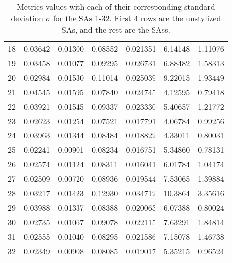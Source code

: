 \begin{table}[H]
\begin{tabular}{|l|l|l|l|l|l|l|}
	18 & 0.03642& 0.01300 & 0.08552& 0.021351 & 6.14148 & 1.11076\\
	19 & 0.03458& 0.01077 & 0.09295& 0.026731 & 6.88482 & 1.58313\\
	20 & 0.02984& 0.01530 & 0.11014& 0.025039 & 9.22015 & 1.93449\\
	21 & 0.04545& 0.01595 & 0.07840& 0.024745 & 4.12595 & 0.79418\\
	22 & 0.03921& 0.01545 & 0.09337& 0.023330 & 5.40657 & 1.21772\\
	23 & 0.02623& 0.01254 & 0.07521& 0.017791 & 4.06784 & 0.99256\\
	24 & 0.03963& 0.01344 & 0.08484& 0.018822 & 4.33011 & 0.80031\\
	25 & 0.02241& 0.00901 & 0.08234& 0.016751 & 5.34860 & 0.78131\\
	26 & 0.02574& 0.01124 & 0.08311& 0.016041 & 6.01784 & 1.04174\\
	27 & 0.02509& 0.00720 & 0.08936& 0.019544 & 7.53065 & 1.39884\\
	28 & 0.03217& 0.01423 & 0.12930& 0.034712 & 10.3864 & 3.35616\\
	29 & 0.03988& 0.01337 & 0.08388& 0.020063 & 6.07388 & 0.80024\\
	30 & 0.02735& 0.01067 & 0.09078& 0.022115 & 7.63291 & 1.84814\\
	31 & 0.02555& 0.01040 & 0.08295& 0.021586 & 7.15078 & 1.46738\\
	32 & 0.02349& 0.00908 & 0.08085& 0.019017 & 5.35215 & 0.96524\\
	\hline
	\end{tabular}
	\caption{Metrics values with each of their corresponding standard deviation $\sigma$ for the SAs 1-32. First 4 rows are the unstylized SAs, and the rest are the SAss.}
\end{table}
